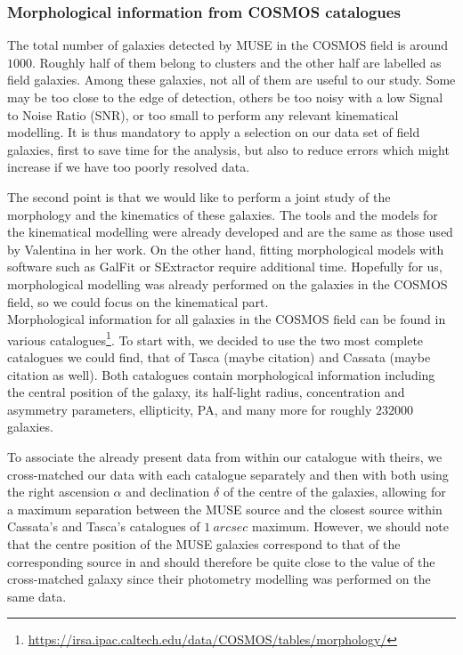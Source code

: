 \subsubsection{Morphological information from COSMOS catalogues}

The total number of galaxies detected by MUSE in the COSMOS field is around $1000$. Roughly half of them belong to clusters and the other half are labelled as field galaxies. Among these galaxies, not all of them are useful to our study. Some may be too close to the edge of detection, others be too noisy with a low Signal to Noise Ratio (SNR), or too small to perform any relevant kinematical modelling. It is thus mandatory to apply a selection on our data set of field galaxies, first to save time for the analysis, but also to reduce errors which might increase if we have too poorly resolved data.

The second point is that we would like to perform a joint study of the morphology and the kinematics of these galaxies. The tools and the models for the kinematical modelling were already developed and are the same as those used by Valentina in her work. On the other hand, fitting morphological models with software such as GalFit or SExtractor require additional time. Hopefully for us, morphological modelling was already performed on the galaxies in the COSMOS field, so we could focus on the kinematical part. \\

Morphological information for all galaxies in the COSMOS field can be found in various catalogues\footnote{\url{https://irsa.ipac.caltech.edu/data/COSMOS/tables/morphology/}}. To start with, we decided to use the two most complete catalogues we could find, that of Tasca (maybe citation) and Cassata (maybe citation as well). Both catalogues contain morphological information including the central position of the galaxy, its half-light radius, concentration and asymmetry parameters, ellipticity, PA, and many more for roughly $232 000$ galaxies. 

To associate the already present data from  within our catalogue with theirs, we cross-matched our data with each catalogue separately and then with both using the right ascension $\alpha$ and declination $\delta$ of the centre of the galaxies, allowing for a maximum separation between the MUSE source and the closest source within Cassata's and Tasca's catalogues of $\SI{1}{arcsec}$ maximum. However, we should note that the centre position of the MUSE galaxies correspond to that of the corresponding source in  and should therefore be quite close to the value of the cross-matched galaxy since their photometry modelling was performed on the same data. \\

